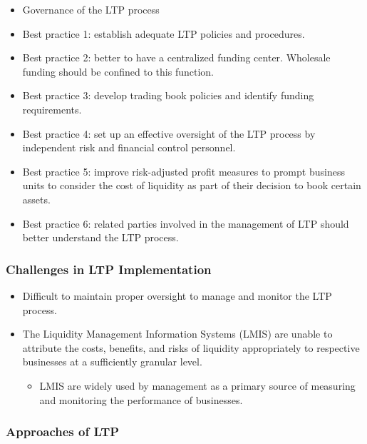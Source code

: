 \begin{itemize}
  \item Governance of the LTP process
  \item Best practice 1: establish adequate LTP policies and procedures.
  \item Best practice 2: better to have a centralized funding center. Wholesale funding should be confined to this function.
  \item Best practice 3: develop trading book policies and identify funding requirements.
  \item Best practice 4: set up an effective oversight of the LTP process by independent risk and financial control personnel.
  \item Best practice 5: improve risk-adjusted profit measures to prompt business units to consider the cost of liquidity as part of their decision to book certain assets.
  \item Best practice 6: related parties involved in the management of LTP should better understand the LTP process. 


\end{itemize}

\subsubsection{Challenges in LTP Implementation}

\begin{itemize}
  \item Difficult to maintain proper oversight to manage and monitor the LTP process.
  \item The Liquidity Management Information Systems (LMIS) are unable to attribute the costs, benefits, and risks of liquidity appropriately to respective businesses at a sufficiently granular level.
    \begin{itemize}
    \item LMIS are widely used by management as a primary source of measuring and monitoring the performance of businesses.
    \end{itemize}
\end{itemize}




\subsubsection{Approaches of LTP}

